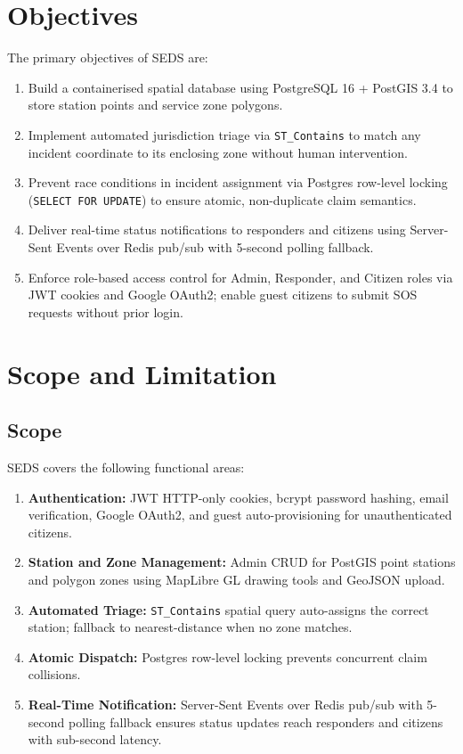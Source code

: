 \section{Objectives}
The primary objectives of SEDS are:
\begin{enumerate}
  \setlength\itemsep{10pt}
  \item Build a containerised spatial database using PostgreSQL 16 + PostGIS 3.4 to store station points and service zone polygons.
  \item Implement automated jurisdiction triage via \texttt{ST\_Contains} to match any incident coordinate to its enclosing zone without human intervention.
  \item Prevent race conditions in incident assignment via Postgres row-level locking (\texttt{SELECT FOR UPDATE}) to ensure atomic, non-duplicate claim semantics.
  \item Deliver real-time status notifications to responders and citizens using Server-Sent Events over Redis pub/sub with 5-second polling fallback.
  \item Enforce role-based access control for Admin, Responder, and Citizen roles via JWT cookies and Google OAuth2; enable guest citizens to submit SOS requests without prior login.
\end{enumerate}

\section{Scope and Limitation}

\subsection{Scope}
SEDS covers the following functional areas:
\begin{enumerate}
  \setlength\itemsep{10pt}
  \item \textbf{Authentication:} JWT HTTP-only cookies, bcrypt password hashing, email verification, Google OAuth2, and guest auto-provisioning for unauthenticated citizens.
  \item \textbf{Station and Zone Management:} Admin CRUD for PostGIS point stations and polygon zones using MapLibre GL drawing tools and GeoJSON upload.
  \item \textbf{Automated Triage:} \texttt{ST\_Contains} spatial query auto-assigns the correct station; fallback to nearest-distance when no zone matches.
  \item \textbf{Atomic Dispatch:} Postgres row-level locking prevents concurrent claim collisions.
  \item \textbf{Real-Time Notification:} Server-Sent Events over Redis pub/sub with 5-second polling fallback ensures status updates reach responders and citizens with sub-second latency.
\end{enumerate}

